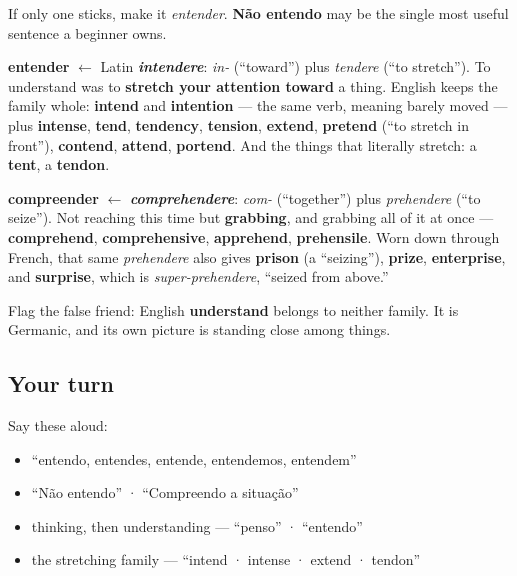 If only one sticks, make it \emph{entender}. \textbf{Não entendo} may be the single most useful sentence a beginner owns.

\begin{cousinweb}
\textbf{entender} $\leftarrow$ Latin \emph{\textbf{intendere}}: \emph{in-} (\textquotedblleft{}toward\textquotedblright{}) plus \emph{tendere} (\textquotedblleft{}to stretch\textquotedblright{}). To understand was to \textbf{stretch your attention toward} a thing. English keeps the family whole: \textbf{intend} and \textbf{intention} — the same verb, meaning barely moved — plus \textbf{intense}, \textbf{tend}, \textbf{tendency}, \textbf{tension}, \textbf{extend}, \textbf{pretend} (\textquotedblleft{}to stretch in front\textquotedblright{}), \textbf{contend}, \textbf{attend}, \textbf{portend}. And the things that literally stretch: a \textbf{tent}, a \textbf{tendon}.

\textbf{compreender} $\leftarrow$ \emph{\textbf{comprehendere}}: \emph{com-} (\textquotedblleft{}together\textquotedblright{}) plus \emph{prehendere} (\textquotedblleft{}to seize\textquotedblright{}). Not reaching this time but \textbf{grabbing}, and grabbing all of it at once — \textbf{comprehend}, \textbf{comprehensive}, \textbf{apprehend}, \textbf{prehensile}. Worn down through French, that same \emph{prehendere} also gives \textbf{prison} (a \textquotedblleft{}seizing\textquotedblright{}), \textbf{prize}, \textbf{enterprise}, and \textbf{surprise}, which is \emph{super-prehendere}, \textquotedblleft{}seized from above.\textquotedblright{}

Flag the false friend: English \textbf{understand} belongs to neither family. It is Germanic, and its own picture is standing close among things.
\end{cousinweb}

\subsection*{Your turn}
Say these aloud:

\begin{itemize}
\raggedright
  \item \textquotedblleft{}entendo, entendes, entende, entendemos, entendem\textquotedblright{}
  \item \textquotedblleft{}Não entendo\textquotedblright{} · \textquotedblleft{}Compreendo a situação\textquotedblright{}
  \item thinking, then understanding — \textquotedblleft{}penso\textquotedblright{} · \textquotedblleft{}entendo\textquotedblright{}
  \item the stretching family — \textquotedblleft{}intend · intense · extend · tendon\textquotedblright{}
\end{itemize}

